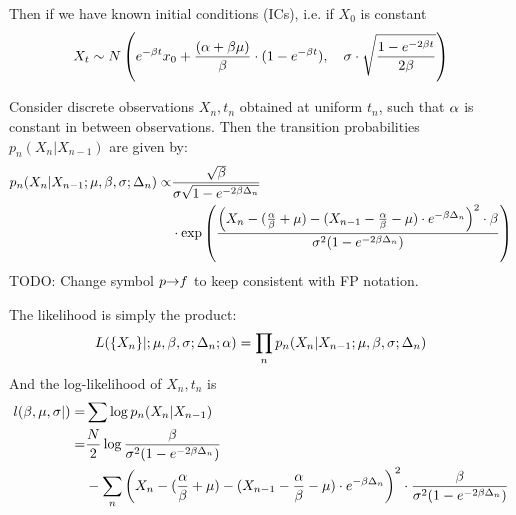 Then if we have known initial conditions (ICs), i.e. if $X_0$ is constant 
$$
X_t \sim N \left(e^{-\beta t} x_0 + \frac{(\alpha + \beta {\mu })}{\beta} \cdot ( 1- e^{-\beta t}),
\quad  \sigma  \cdot \sqrt{ \frac{ 1 - e^{-2\beta t}}{2\beta}} \right)
$$

Consider discrete observations ${X_n, t_n}$ obtained at uniform
$t_n$, such that $\alpha$ is constant in between observations.
Then the transition probabilities $p_n(X_n|X_{n-1})$ are given by:
\begin{align*}
p_n(X_n|X_{n-1}; {\mu },\beta, \sigma; \Delta_n) \propto &
\frac{\sqrt {\beta}}{\sigma \sqrt{1 -  e^{-2\beta \Delta_n}}}
\\ &\cdot 
\exp\left(\frac{\left( X_n - (\frac {\alpha}{\beta} + \mu)  - (X_{n-1} - \frac {\alpha}{\beta} - \mu) \cdot
e^{-\beta \Delta_n} \right)^2 \cdot \beta}
			{ \sigma^2  (1-e^{-2\beta\Delta_n})} \right)
\end{align*}
TODO: Change symbol $p {\rightarrow} f$ to keep consistent with FP notation.

The likelihood is simply the product:
\begin{equation}
L( \{X_n\}| ; {\mu },\beta, \sigma; \Delta_n; \alpha) = \prod_n p_n(X_n|X_{n-1}; {\mu },\beta, \sigma;
\Delta_n)
\label{eq:Likelihood_OU}
\end{equation}
And the log-likelihood of  ${X_n, t_n}$ is
\begin{align*}
l(\beta, {\mu }, \sigma | )=& \sum \log p_n(X_n|X_{n-1})
\\
=& \frac{N}{2} \log \frac{\beta}{\sigma^2(1-e^{-2\beta\Delta_n})}
\\ & -\sum_n
{\left( X_n - (\frac {\alpha}{\beta} + \mu)  - 
		(X_{n-1} - \frac {\alpha}{\beta} - \mu) \cdot e^{-\beta \Delta_n} \right)^2 } \cdot
				\frac{\beta}{\sigma^2  (1-e^{-2\beta\Delta_n})}
\end{align*}

\def \Xn {{ X_n }}
\def \Xm {{ X_{n-1} }}
\def \deltan {{ \Delta_n }}

